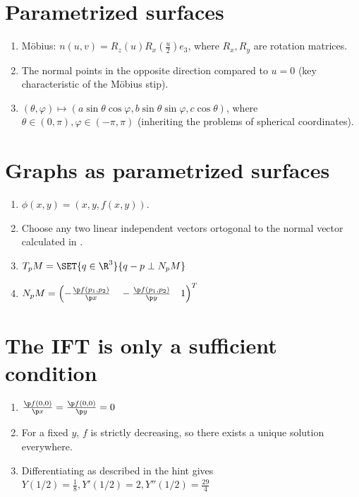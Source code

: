 \documentclass{article}
\begin{document}
\newpage

\section{Parametrized surfaces}
\begin{enumerate}
    \item Möbius: $n(u, v) = R_z(u) R_x\left(\frac{u}{2}\right)  e_3$, where $R_x, R_y$ are rotation matrices. 
    \item The normal points in the opposite direction compared to $u = 0$ (key characteristic of the Möbius stip). 
    \item $(\theta, \varphi) \mapsto (a \sin \theta \cos \varphi, b \sin \theta \sin \varphi, c \cos \theta)$, where $\theta \in (0, \pi), \varphi \in (-\pi, \pi)$ (inheriting the problems of spherical coordinates). 
\end{enumerate}

\section{Graphs as parametrized surfaces}
\begin{enumerate}
    \item $\phi(x, y) = (x, y, f(x, y))$.
    \item Choose any two linear independent vectors ortogonal to the normal vector calculated in . 
    \item $T_pM = \SET{q \in \R^3}{q - p \perp N_pM}$ 
    \item $N_pM = \left(- \frac{\p f(p_1, p_2)}{\p x}\quad - \frac{\p f(p_1, p_2)}{\p y }\quad 1 \right)^T$ 
\end{enumerate}

\section{The IFT is only a sufficient condition}
\begin{enumerate}
    \item $\frac{\p f(0, 0)}{\p x} = \frac{\p f(0, 0)}{\p y} = 0$
    \item For a fixed $y$, $f$ is strictly decreasing, so there exists a unique solution everywhere. 
    \item Differentiating as described in the hint gives $Y(1/2) = \frac{1}{8}, Y'(1/2) = 2, Y''(1/2) = \frac{29}{4}$ 
\end{enumerate}
\end{document}
